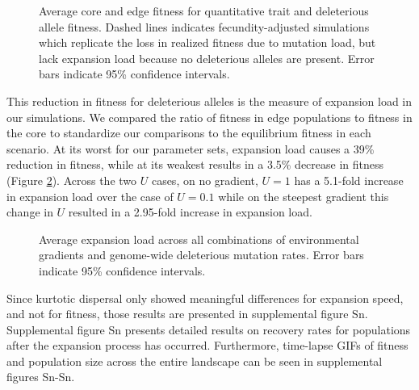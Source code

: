 \begin{figure}[h]
\centering
{}
\caption[Average core and edge fitness.]{Average core and edge fitness for quantitative trait and deleterious allele fitness. Dashed lines indicates fecundity-adjusted simulations which replicate the loss in realized fitness due to mutation load, but lack expansion load because no deleterious alleles are present. Error bars indicate 95\% confidence intervals.}
\label{fig:fitness}
\end{figure}


This reduction in fitness for deleterious alleles is the measure of expansion load in our simulations. We compared the ratio of fitness in edge populations to fitness in the core to standardize our comparisons to the equilibrium fitness in each scenario. At its worst for our parameter sets, expansion load causes a 39\% reduction in fitness, while at its weakest results in a 3.5\% decrease in fitness (Figure \ref{fig:load}). %
Across the two $U$ cases, on no gradient, $U = 1$ has a 5.1-fold increase in expansion load over the case of $U = 0.1$ while on the steepest gradient this change in $U$ resulted in a 2.95-fold increase in expansion load.

\begin{figure}[h]
\centering
{}
\caption[Average expansion load.]{Average expansion load across all combinations of environmental gradients and genome-wide deleterious mutation rates. Error bars indicate 95\% confidence intervals.}
\label{fig:load}
\end{figure}


Since kurtotic dispersal only showed meaningful differences for expansion speed, and not for fitness, those results are presented in supplemental figure \color{red}Sn\color{black}. Supplemental figure \color{red}Sn \color{black} presents detailed results on recovery rates for populations after the expansion process has occurred. Furthermore, time-lapse GIFs of fitness and population size across the entire landscape can be seen in supplemental figures \color{red}Sn-Sn\color{black}.


